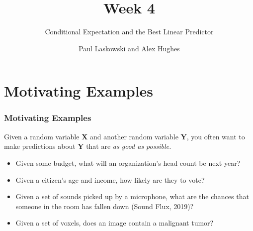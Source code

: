 \documentclass[12pt, block=fill]{beamer}
\title{Week 4}
\subtitle{Conditional Expectation and the Best Linear Predictor}
\author{Paul Laskowski and Alex Hughes}
\institute{UC Berkeley, School of Information}
\begin{document}
\begin{frame}
  \maketitle
\end{frame}

\section{Motivating Examples}

\begin{frame}
  \frametitle{Motivating Examples}

  Given a random variable \textbf{X} and another random variable
  \textbf{Y}, you often want to make predictions about \textbf{Y} that
  are \textit{as good as possible.}


  \begin{itemize}
  \item Given some budget, what will an organization's head count be
    next year?
  \item Given a citizen's age and income, how likely are they to vote?
  \item Given a set of sounds picked up by a microphone, what are the
    chances that someone in the room has fallen down (Sound Flux,
    2019)?
  \item Given a set of voxels, does an image contain a malignant
    tumor?
  \end{itemize}

  
\end{frame}
\end{document}
